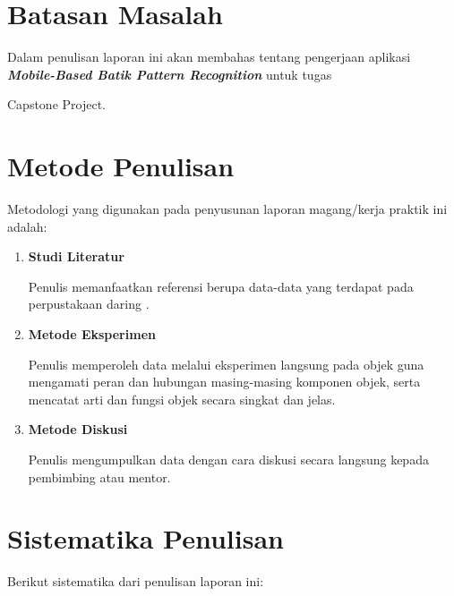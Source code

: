 \section{Batasan Masalah}

Dalam penulisan laporan ini akan membahas tentang pengerjaan aplikasi \textbf{\textit{Mobile-Based Batik Pattern Recognition}} untuk tugas \item{Capstone Project}.

\section{Metode Penulisan}

Metodologi yang digunakan pada penyusunan laporan magang/kerja praktik ini adalah:

\begin{enumerate}[nolistsep]

  \item \textbf{Studi Literatur}

  Penulis memanfaatkan referensi berupa data-data yang terdapat pada perpustakaan daring \cite{gultom2018batik}.

  \item \textbf{Metode Eksperimen}

  Penulis memperoleh data melalui eksperimen langsung pada objek guna mengamati peran dan hubungan masing-masing komponen objek, serta mencatat arti dan fungsi objek secara singkat dan jelas.

  \item \textbf{Metode Diskusi}

  Penulis mengumpulkan data dengan cara diskusi secara langsung kepada pembimbing atau mentor.

\end{enumerate}

\section{Sistematika Penulisan}

Berikut sistematika dari penulisan laporan ini:

